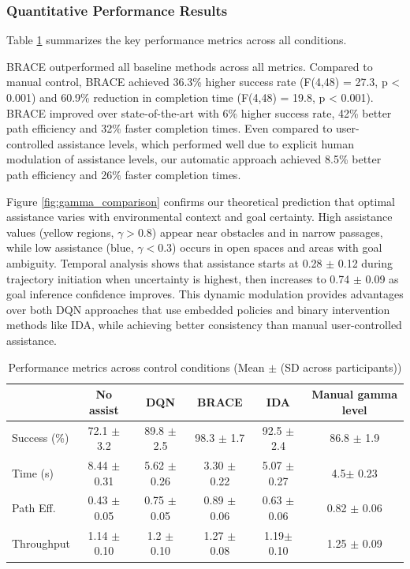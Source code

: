 \documentclass[11pt]{article}
\begin{document}
\subsubsection{Quantitative Performance Results}

Table \ref{tab:performance} summarizes the key performance metrics across all conditions.


BRACE outperformed all baseline methods across all metrics. Compared to manual control, BRACE achieved 36.3\% higher success rate (F(4,48) = 27.3, p < 0.001) and 60.9\% reduction in completion time (F(4,48) = 19.8, p < 0.001). BRACE improved over state-of-the-art with 6\% higher success rate, 42\% better path efficiency and 32\% faster completion times. Even compared to user-controlled assistance levels, which performed well due to explicit human modulation of assistance levels, our automatic approach achieved 8.5\% better path efficiency and 26\% faster completion times.




Figure \ref{fig:gamma_comparison} confirms our theoretical prediction that optimal assistance varies with environmental context and goal certainty. High assistance values (yellow regions, $\gamma > 0.8$) appear near obstacles and in narrow passages, while low assistance (blue, $\gamma < 0.3$) occurs in open spaces and areas with goal ambiguity. Temporal analysis shows that assistance starts at 0.28 $\pm$ 0.12 during trajectory initiation when uncertainty is highest, then increases to 0.74 $\pm$ 0.09 as goal inference confidence improves. This dynamic modulation provides advantages over both DQN approaches that use embedded policies and binary intervention methods like IDA, while achieving better consistency than manual user-controlled assistance.



\begin{table}[h]
\caption{Performance metrics across control conditions (Mean $\pm$ (SD across participants))}
\label{tab:performance}
\centering
\begin{tabular}{lccccc}
\toprule
& No assist & DQN & BRACE & IDA & Manual gamma level \\
\midrule
Success (\%) & 72.1 $\pm$ 3.2& 89.8 $\pm$ 2.5& 98.3 $\pm$ 1.7 & 92.5 $\pm$ 2.4& 86.8 $\pm$ 1.9\\
Time (s) & 8.44 $\pm$ 0.31 & 5.62 $\pm$ 0.26& 3.30 $\pm$ 0.22 & 5.07 $\pm$ 0.27& 4.5$\pm$ 0.23\\
Path Eff. & 0.43 $\pm$ 0.05 & 0.75 $\pm$ 0.05 & 0.89 $\pm$ 0.06 & 0.63 $\pm$ 0.06& 0.82 $\pm$ 0.06 \\
Throughput & 1.14 $\pm$ 0.10 & 1.2 $\pm$ 0.10& 1.27 $\pm$ 0.08 & 1.19$\pm$ 0.10& 1.25 $\pm$ 0.09 \\
\bottomrule
\end{tabular}
\end{table}
\end{document}
